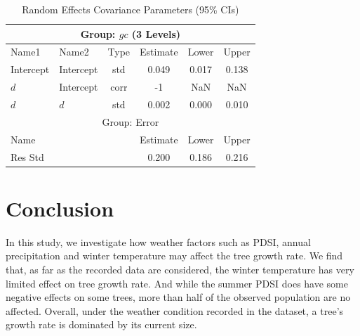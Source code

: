 \documentclass{article}
\begin{document}
\begin{table}[h!]
    \centering
    \begin{tabular}{ |l | l | c | c | c | c |} 
        \hline
        \multicolumn{6}{|c|}{Group: $gc$ (3 Levels)} \\
        \hline
        Name1 & Name2 & Type & Estimate & Lower & Upper\\ 
        \hline
        Intercept & Intercept & std & 0.049 & 0.017 & 0.138\\
        \hline
        $d$ & Intercept & corr &  -1 & NaN & NaN \\
        \hline
        $d$ & $d$ & std & 0.002 & 0.000 & 0.010 \\
        \hline

        \multicolumn{6}{|c|}{Group: Error} \\
        \hline
        \multicolumn{3}{|l|}{Name} & Estimate & Lower & Upper \\
        \hline
        \multicolumn{3}{|l|}{Res Std} & 0.200 & 0.186 & 0.216 \\
        \hline
        \end{tabular}
    \caption{Random Effects Covariance Parameters (95\% CIs)}
\end{table}

\section*{Conclusion}

In this study, we investigate how weather factors such as PDSI, annual precipitation and winter temperature may affect the tree growth rate. We find that, as far as the recorded data are considered, the winter temperature has very limited effect on tree growth rate. And while the summer PDSI does have some negative effects on some trees, more than half of the observed population are no affected. Overall, under the weather condition recorded in the dataset, a tree's growth rate is dominated by its current size. 


 

\end{document}
